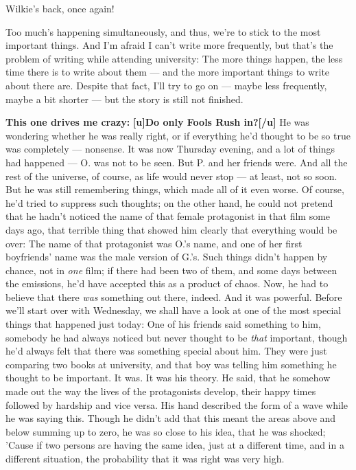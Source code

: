 Wilkie's back, once again!

Too much's happening simultaneously, and thus, we're to stick to the most important things. And I'm afraid I can't write more frequently, but that's the problem of writing while attending university: The more things happen, the less time there is to write about them --- and the more important things to write about there are. 
Despite that fact, I'll try to go on --- maybe less frequently, maybe a bit shorter --- but the story is still not finished. 

\textbf{This one drives me crazy:}
\textbf{[u]Do only Fools Rush in?[/u]}
He was wondering whether he was really right, or if everything he'd thought to be so true was completely --- nonsense. 
It was now Thursday evening, and a lot of things had happened --- O. was not to be seen. 
But P. and her friends were. 
And all the rest of the universe, of course, as life would never stop --- at least, not so soon. 
But he was still remembering things, which made all of it even worse. Of course, he'd tried to suppress such thoughts; on the other hand, he could not pretend that he hadn't noticed the name of that female protagonist in that film some days ago, that terrible thing that showed him clearly that everything would be over: The name of that protagonist was O.'s name, and one of her first boyfriends' name was the male version of G.'s. 
Such things didn't happen by chance, not in \emph{one} film; if there had been two of them, and some days between the emissions, he'd have accepted this as a product of chaos. 
Now, he had to believe that there \emph{was} something out there, indeed. 
And it was powerful. 
Before we'll start over with Wednesday, we shall have a look at one of the most special things that happened just today: One of his friends said something to him, somebody he had always noticed but never thought to be \emph{that} important, though he'd always felt that there was something special about him. 
They were just comparing two books at university, and that boy was telling him something he thought to be important. 
It was. 
It was his theory. 
He said, that he somehow made out the way the lives of the protagonists develop, their happy times followed by hardship and vice versa. 
His hand described the form of a wave while he was saying this. 
Though he didn't add that this meant the areas above and below summing up to zero, he was so close to his idea, that he was shocked; 'Cause if two persons are having the same idea, just at a different time, and in a different situation, the probability that it was right was very high. 

